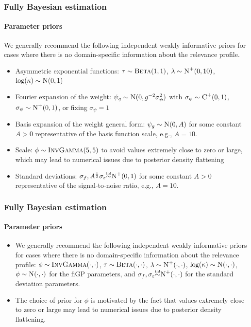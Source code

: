 \documentclass{snedecorbeamer}
\begin{document}
\begin{frame}%
  \label{frm:bayesian-priors}
  \frametitle{Fully Bayesian estimation}
  \framesubtitle{Parameter priors}

  We generally recommend the following independent weakly informative priors for
  cases where there is no domain-specific information about the relevance profile.
  \begin{itemize}
  \item Asymmetric exponential functions:
    $\tau \sim \textsc{Beta}(1, 1)$,
    $\lambda \sim \textsc{N}^{+}(0, 10)$,
    $\log(\kappa) \sim \textsc{N}(0, 1)$
  \item Fourier expansion of the weight:
    $\psi_g\sim\textsc{N}(0, g^{-2}\sigma^2_\psi)$ with
    $\sigma_\psi\sim\textsc{C}^+(0, 1)$, $\sigma_\psi\sim\textsc{N}^+(0, 1)$,
    or fixing $\sigma_\psi = 1$
  \item Basis expansion of the weight general form:
    $\psi_g \sim \textsc{N}(0, A)$ for some constant
    $A>0$ representative of the basis function scale, e.g., $A = 10$.
  \item Scale: $\phi \sim \textsc{InvGamma}(5, 5)$ to avoid
    values extremely close to zero or large, which may lead to numerical issues
    due to posterior density flattening
  \item Standard deviations: $\sigma_f, A^{\frac{1}{2}}\sigma_{\varepsilon}
    \smash{\overset{\text{\tiny iid}}{\sim}} \textsc{N}^{+}(0, 1)$ for some constant $A>0$
    representative of the signal-to-noise ratio, e.g., $A = 10$.
  \end{itemize}
\end{frame}

\begin{frame}%
  \label{frm:bayesian-priors}
  \frametitle{Fully Bayesian estimation}
  \framesubtitle{Parameter priors}

  \begin{itemize}
  \item We generally recommend the following independent weakly informative
    priors for cases where there is no domain-specific information about
    the relevance profile:
    $\phi \sim \textsc{InvGamma}(\cdot, \cdot)$,
    $\tau \sim \textsc{Beta}(\cdot, \cdot)$,
    $\lambda \sim \textsc{N}^{+}(\cdot, \cdot)$,
    $\log(\kappa) \sim \textsc{N}(\cdot, \cdot)$,
    $\phi\sim\textsc{N}(\cdot, \cdot)$
    for the fiGP parameters, and
    $\sigma_f, \sigma_{\varepsilon} \smash{\overset{\text{\tiny iid}}{\sim}} \textsc{N}^{+}(\cdot, \cdot)$
    for the standard deviation parameters.
  \item The choice
    of prior for $\phi$ is motivated by the fact that values extremely
    close to zero or large may lead to numerical issues due to posterior
    density flattening.
  \end{itemize}
\end{frame}
\end{document}
